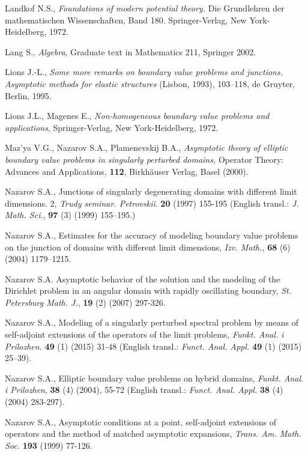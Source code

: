 \documentclass[11pt]{article}%
\numberwithin{equation}{section}
\begin{document}
\begin{thebibliography}{99}
Landkof N.S., \textit{Foundations of modern potential theory.}
Die Grundlehren der mathematischen Wissenschaften, Band 180. Springer-Verlag,
New York-Heidelberg, 1972.

Lang S., \textit{Algebra}, Graduate text in Mathematics 211,
Springer 2002.

Lions J.-L., \textit{Some more remarks on boundary value
problems and junctions. Asymptotic methods for elastic structures }(Lisbon,
1993), 103--118, de Gruyter, Berlin, 1995.

Lions J.L., Magenes E., \textit{Non-homogeneous boundary value
problems and applications}, Springer-Verlag, New York-Heidelberg, 1972.

Maz'ya V.G., Nazarov S.A., Plamenevskij B.A.,
\textit{Asymptotic theory of elliptic boundary value problems in singularly
perturbed domains,} Operator Theory: Advances and Applications, \textbf{112},
Birkh\"{a}user Verlag, Basel (2000).

Nazarov S.A., Junctions of singularly degenerating domains
with different limit dimensions. 2, \textit{Trudy seminar. Petrovskii}.
\textbf{20} (1997) 155-195 (English transl.: \textit{J. Math. Sci.},
\textbf{97} (3) (1999) 155--195.)

Nazarov S.A., Estimates for the accuracy of modeling boundary
value problems on the junction of domains with different limit dimensions,
\textit{Izv. Math.}, \textbf{68} (6) (2004) 1179--1215.

Nazarov S.A. Asymptotic behavior of the solution and the
modeling of the Dirichlet problem in an angular domain with rapidly
oscillating boundary, \textit{St. Petersburg Math. J.}, \textbf{19} (2) (2007) 297-326.

Nazarov S.A., Modeling of a singularly perturbed spectral
problem by means of self-adjoint extensions of the operators of the limit
problems, \textit{Funkt. Anal. i Prilozhen.} \textbf{49} (1) (2015) 31-48
(English transl.: \textit{Funct. Anal. Appl.} \textbf{49} (1) (2015) 25--39).

Nazarov S.A., Elliptic boundary value problems on hybrid
domains, \textit{Funkt. Anal. i Prilozhen}, \textbf{38} (4) (2004), 55-72
(English transl.: \textit{Funct. Anal. Appl.} \textbf{38} (4) (2004) 283-297).

Nazarov S.A., Asymptotic conditions at a point, self-adjoint
extensions of operators and the method of matched asymptotic expansions,
\textit{Trans. Am. Math. Soc.} \textbf{193} (1999) 77-126.


\end{thebibliography}
\end{document}
